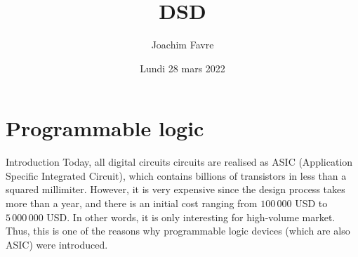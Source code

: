 \documentclass[a4paper]{article}
\title{DSD}
\author{Joachim Favre}
\date{Lundi 28 mars 2022}
\begin{document}
\maketitle


\section{Programmable logic}
\begin{parag}{Introduction}
    Today, all digital circuits circuits are realised as ASIC (Application Specific Integrated Circuit), which contains billions of transistors in less than a squared millimiter. However, it is very expensive since the design process takes more than a year, and there is an initial cost ranging from $100\,000$ USD to $5\,000\,000$ USD. In other words, it is only interesting for high-volume market. Thus, this is one of the reasons why programmable logic devices (which are also ASIC) were introduced.
\end{parag}
\end{document}
